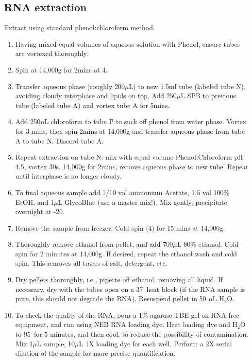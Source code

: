\documentclass{article}
\newcommand{\mul}{\ensuremath{\mu}L\xspace}
\newcommand{\degC}{\celsius\xspace}
\begin{document}
\subsection*{RNA extraction}
Extract using standard phenol:chloroform method.
\begin{enumerate}[resume]
  \item Having mixed equal volumes of aqueous solution with Phenol, ensure tubes are vortexed thoroughly.
  \item Spin at 14,000g for 2mins at 4\degC. 
  \item Transfer aqueous phase (roughly 200\mul) to new 1.5ml tube  (labeled tube N), avoiding cloudy interphase and lipids on top. Add 250\mul SPB to previous tube (labeled tube A) and vortex tube A for 5mins.
\item Add 250\mul chloroform to tube P to suck off phenol from water phase. Vortex for 3 mins, then spin 2mins at 14,000g and transfer aqueous phase from tube A to tube N. Discard tube A.
  \item Repeat extraction on tube N: mix with equal volume Phenol:Chloroform pH 4.5, vortex 30s, 14,000g for 2mins, remove aqueous phase to new tube. Repeat until interphase is no longer cloudy.
  \item To final aqueous sample add 1/10 vol ammonium Acetate, 1.5 vol 100\% EtOH, and 1\mul GlycoBlue (use a master mix!). Mix gently, precipitate overnight at -20\degC.
  \item Remove the sample from freezer. Cold spin (4\degC) for 15 mins at 14,000g. 
\item Thoroughly remove ethanol from pellet, and add 700\mul 80\% ethanol. Cold spin for 2 minutes at 14,000g. If desired, repeat the ethanol wash and cold spin. This removes all traces of salt, detergent, etc.
\item Dry pellets thoroughly, i.e., pipette off ethanol, removing all liquid. If necessary, dry with the tubes open on a 37\degC\ heat block (if the RNA sample is pure, this should not degrade the RNA). Resuspend pellet in 50 \mul H$_2$O.
\item To check the quality of the RNA, pour a 1\% agarose-TBE gel on RNA-free equipment, and run using NEB RNA loading dye. Heat loading dye and H$_2$O to 95\degC\ for 5 minutes, and then cool, to reduce the possibility of contamination. Mix 1\mul sample, 10\mul 1X loading dye for each well. Perform a 2X serial dilution of the sample for more precise quantification.
\end{enumerate}
\end{document}
